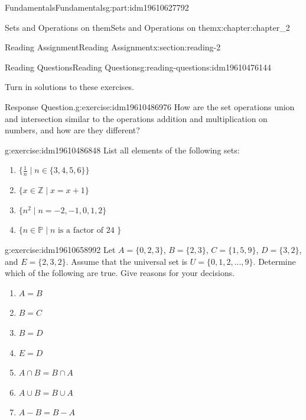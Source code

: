 \documentclass[oneside,10pt,]{book}
\numberwithin{equation}{section}
\begin{document}
\begin{partptx}{Fundamentals}{}{Fundamentals}{}{}{g:part:idm19610627792}
\begin{chapterptx}{Sets and Operations on them}{}{Sets and Operations on them}{}{}{x:chapter:chapter_2}
\begin{sectionptx}{Reading Assignment}{}{Reading Assignment}{}{}{x:section:reading-2}
%
%
\typeout{************************************************}
\typeout{************************************************}
%
\begin{reading-questions-subsection-numberless}{Reading Questions}{}{Reading Questions}{}{}{g:reading-questions:idm19610476144}
\begin{introduction}{}%
Turn in solutions to these exercises.%
\end{introduction}%
\begin{divisionexercise}{1}{Response Question.}{}{g:exercise:idm19610486976}%
How are the set operations union and intersection similar to the operations addition and multiplication on numbers, and how are they different?%
\end{divisionexercise}%
\begin{divisionexercise}{2}{}{}{g:exercise:idm19610486848}%
List all elements of the following sets:%
\begin{enumerate}[label=(\alph*)]
\item{}\(\displaystyle \{\frac{1}{n} \mid n \in \{3,4,5,6\}\}\)%
\item{}\(\displaystyle \{x \in \mathbb{Z} \mid x = x+1 \}\)%
\item{}\(\displaystyle \{n^2 \mid  n = -2, -1, 0, 1, 2\}\)%
\item{}\(\displaystyle \{n \in  \mathbb{P} \mid n \textrm{ is a  factor of  24 }\}\)%
\end{enumerate}
%
\end{divisionexercise}%
\begin{divisionexercise}{3}{}{}{g:exercise:idm19610658992}%
Let \(A = \{0, 2, 3\}\), \(B = \{2, 3\}\), \(C = \{1, 5, 9\}\), \(D = \{3, 2\}\), and \(E = \{2, 3, 2\}\). Assume that the universal set is \(U = \{0, 1, 2, . . . , 9\}\). Determine which of the following are true. Give reasons for your decisions.%
\begin{multicols}{2}
\begin{enumerate}[label=(\alph*)]
\item{}\(\displaystyle A = B\)%
\item{}\(\displaystyle B = C\)%
\item{}\(\displaystyle B = D\)%
\item{}\(\displaystyle E=D\)%
\item{}\(\displaystyle A\cap B = B\cap A\)%
\item{}\(\displaystyle A \cup  B = B \cup  A\)%
\item{}\(\displaystyle A-B = B-A\)%

\end{enumerate}
\end{multicols}
\end{divisionexercise}
\end{reading-questions-subsection-numberless}
\end{sectionptx}
\end{chapterptx}
\end{partptx}
\end{document}
